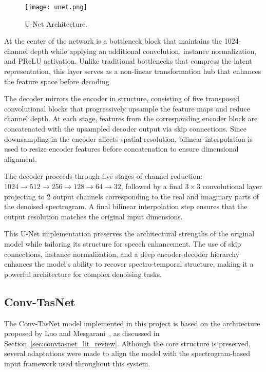 \begin{figure}[h]
    \centering
    \texttt{[image: unet.png]}
    \caption{\label{fig:unet}U-Net Architecture.}
\end{figure}

At the center of the network is a bottleneck block that maintains the 1024-channel depth while applying an additional convolution, instance normalization, and PReLU activation. Unlike traditional bottlenecks that compress the latent representation, this layer serves as a non-linear transformation hub that enhances the feature space before decoding.

The decoder mirrors the encoder in structure, consisting of five transposed convolutional blocks that progressively upsample the feature maps and reduce channel depth. At each stage, features from the corresponding encoder block are concatenated with the upsampled decoder output via skip connections. Since downsampling in the encoder affects spatial resolution, bilinear interpolation is used to resize encoder features before concatenation to ensure dimensional alignment.

The decoder proceeds through five stages of channel reduction: \(1024 \rightarrow 512 \rightarrow 256 \rightarrow 128 \rightarrow 64 \rightarrow 32\), followed by a final \(3 \times 3\) convolutional layer projecting to 2 output channels corresponding to the real and imaginary parts of the denoised spectrogram. A final bilinear interpolation step ensures that the output resolution matches the original input dimensions.

This U-Net implementation preserves the architectural strengths of the original model while tailoring its structure for speech enhancement. The use of skip connections, instance normalization, and a deep encoder-decoder hierarchy enhances the model’s ability to recover spectro-temporal structure, making it a powerful architecture for complex denoising tasks.

\subsection{Conv-TasNet}
\label{sec:convtasnet}

The Conv-TasNet model implemented in this project is based on the architecture proposed by Luo and Mesgarani~\cite{luo2019conv}, as discussed in Section~\ref{sec:convtasnet_lit_review}. Although the core structure is preserved, several adaptations were made to align the model with the spectrogram-based input framework used throughout this system.

